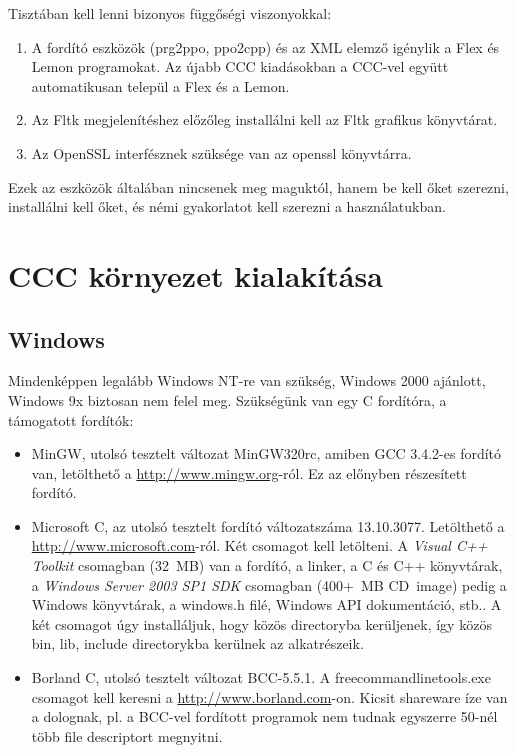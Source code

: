 
Tisztában kell lenni bizonyos függőségi viszonyokkal:
\begin{enumerate}
\item 
  A fordító eszközök (prg2ppo, ppo2cpp) és az XML elemző
  igénylik a Flex és Lemon programokat. Az újabb CCC kiadásokban
  a CCC-vel együtt automatikusan települ a Flex és a Lemon. 
\item 
  Az Fltk megjelenítéshez előzőleg installálni kell az Fltk
  grafikus könyvtárat.
\item
  Az OpenSSL interfésznek szüksége van az openssl könyvtárra.  
\end{enumerate}
Ezek az eszközök általában nincsenek meg maguktól, 
hanem be kell őket szerezni, installálni kell őket, 
és némi gyakorlatot kell szerezni a használatukban.
 

\section{CCC környezet kialakítása}

\subsection{Windows}

Mindenképpen legalább Windows NT-re van szükség, Windows 2000 ajánlott, 
Windows 9x biztosan nem felel meg.
Szükségünk van egy C fordítóra, a támogatott fordítók:
\begin{itemize}
\item 
    MinGW, utolsó tesztelt változat MinGW320rc, 
    amiben GCC 3.4.2-es fordító van,
    letölthető a \href{http://www.mingw.org}{http://www.mingw.org}-ról.
    Ez az előnyben részesített fordító.
\item 
    Microsoft C, az utolsó tesztelt fordító változatszáma 13.10.3077.
    Letölthető a \href{http://www.microsoft.com}{http://www.microsoft.com}-ról.
    Két csomagot kell letölteni. A {\em Visual C++ Toolkit} csomagban (32~MB)
    van a fordító, a linker, a C és C++ könyvtárak, 
    a {\em Windows Server 2003 SP1 SDK} csomagban (400+~MB CD~image) pedig 
    a Windows könyvtárak, a windows.h filé, Windows API dokumentáció, stb.. 
    A két csomagot úgy installáljuk, hogy közös directoryba kerüljenek, 
    így közös bin, lib, include  directorykba kerülnek  az alkatrészeik.
\item 
    Borland C, utolsó tesztelt változat BCC-5.5.1. 
    A freecommandlinetools.exe csomagot kell keresni a
    \href{http://www.borland.com}{http://www.borland.com}-on.
    Kicsit shareware íze van a dolognak, pl. a BCC-vel fordított 
    programok nem tudnak egyszerre 50-nél több file descriptort megnyitni.
\end{itemize}


